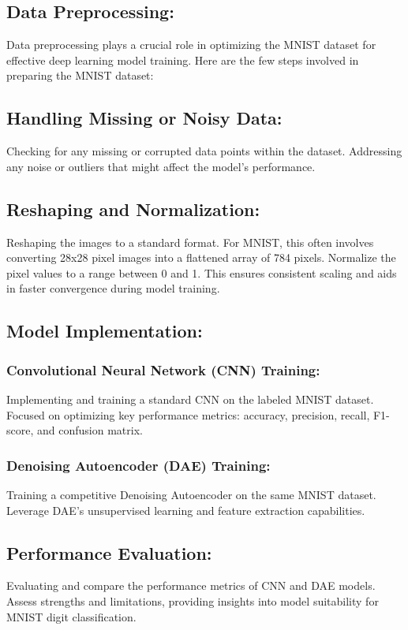 \subsection{Data Preprocessing:}
Data preprocessing plays a crucial role in optimizing the MNIST dataset for effective deep learning model training. Here are the few steps involved in preparing the MNIST dataset:

\subsection{Handling Missing or Noisy Data:}

Checking for any missing or corrupted data points within the dataset.
Addressing any noise or outliers that might affect the model's performance.

\subsection{Reshaping and Normalization:}

Reshaping the images to a standard format. For MNIST, this often involves converting 28x28 pixel images into a flattened array of 784 pixels.
Normalize the pixel values to a range between 0 and 1. This ensures consistent scaling and aids in faster convergence during model training.

\subsection{Model Implementation:}
\subsubsection{Convolutional Neural Network (CNN) Training:}
Implementing and training a standard CNN on the labeled MNIST dataset.
Focused on optimizing key performance metrics: accuracy, precision, recall, F1-score, and confusion matrix.

\subsubsection{Denoising Autoencoder (DAE) Training:}
Training a competitive Denoising Autoencoder on the same MNIST dataset.
Leverage DAE's unsupervised learning and feature extraction capabilities.

\subsection{Performance Evaluation:}
Evaluating and compare the performance metrics of CNN and DAE models.
Assess strengths and limitations, providing insights into model suitability for MNIST digit classification.

